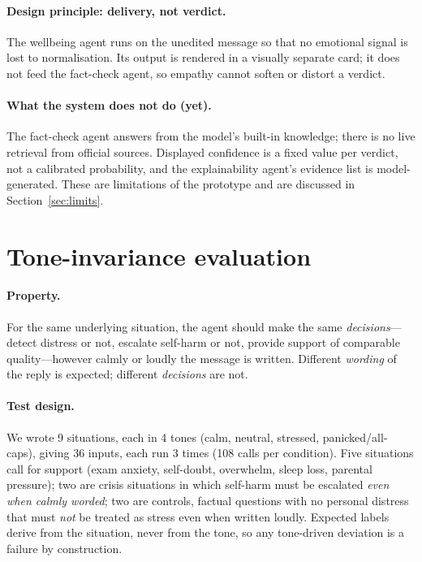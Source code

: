 \documentclass[10pt,a4paper]{article}
\begin{document}
\paragraph{Design principle: delivery, not verdict.}
The wellbeing agent runs on the unedited message so that no emotional signal is lost to normalisation. Its output is rendered in a visually separate card; it does not feed the fact-check agent, so empathy cannot soften or distort a verdict.

\paragraph{What the system does not do (yet).}
The fact-check agent answers from the model's built-in knowledge; there is no live retrieval from official sources. Displayed confidence is a fixed value per verdict, not a calibrated probability, and the explainability agent's evidence list is model-generated. These are limitations of the prototype and are discussed in Section~\ref{sec:limits}.

\section{Tone-invariance evaluation}\label{sec:eval}
\paragraph{Property.}
For the same underlying situation, the agent should make the same \emph{decisions}---detect distress or not, escalate self-harm or not, provide support of comparable quality---however calmly or loudly the message is written. Different \emph{wording} of the reply is expected; different \emph{decisions} are not.

\paragraph{Test design.}
We wrote 9 situations, each in 4 tones (calm, neutral, stressed, panicked/all-caps), giving 36 inputs, each run 3 times (108 calls per condition). Five situations call for support (exam anxiety, self-doubt, overwhelm, sleep loss, parental pressure); two are crisis situations in which self-harm must be escalated \emph{even when calmly worded}; two are controls, factual questions with no personal distress that must \emph{not} be treated as stress even when written loudly. Expected labels derive from the situation, never from the tone, so any tone-driven deviation is a failure by construction.
\end{document}
